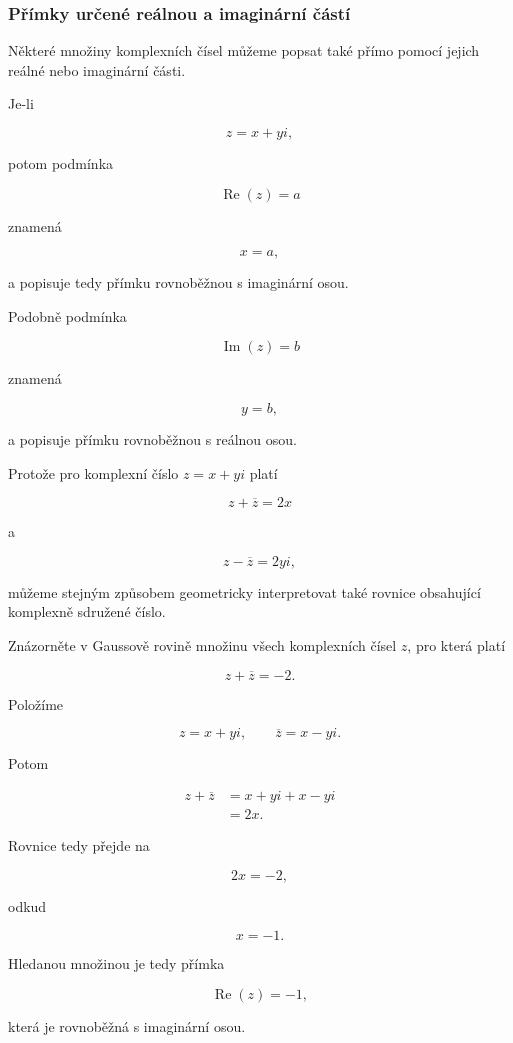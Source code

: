 \documentclass[12pt,a4paper]{article}
\begin{document}
\subsubsection*{Přímky určené reálnou a imaginární částí}

Některé množiny komplexních čísel můžeme popsat také přímo pomocí jejich reálné
nebo imaginární části.

Je-li

\[
    z=x+yi,
\]

potom podmínka

\[
    \operatorname{Re}(z)=a
\]

znamená

\[
    x=a,
\]

a popisuje tedy přímku rovnoběžnou s imaginární osou.

Podobně podmínka

\[
    \operatorname{Im}(z)=b
\]

znamená

\[
    y=b,
\]

a popisuje přímku rovnoběžnou s reálnou osou.

Protože pro komplexní číslo $z=x+yi$ platí

\[
    z+\overline{z}=2x
\]

a

\[
    z-\overline{z}=2yi,
\]

můžeme stejným způsobem geometricky interpretovat také rovnice obsahující
komplexně sdružené číslo.


\begin{examplebox}

Znázorněte v Gaussově rovině množinu všech komplexních čísel $z$, pro která platí

\[
    z+\overline{z}=-2.
\]

Položíme

\[
    z=x+yi,
    \qquad
    \overline{z}=x-yi.
\]

Potom

\begin{align*}
    z+\overline{z}
    &=
    x+yi+x-yi\\
    &=
    2x.
\end{align*}

Rovnice tedy přejde na

\[
    2x=-2,
\]

odkud

\[
    x=-1.
\]

Hledanou množinou je tedy přímka

\[
    \operatorname{Re}(z)=-1,
\]

která je rovnoběžná s imaginární osou.

\end{examplebox}
\end{document}
